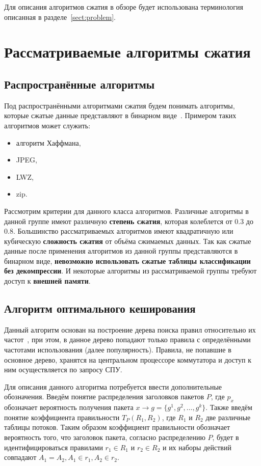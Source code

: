 \documentclass[a4paper, 12pt, titlepage, finall]{extreport}
\begin{document}
        Для описания алгоритмов сжатия в обзоре будет использована терминология описанная в разделе~\ref{sect:problem}. 

    \section{Рассматриваемые алгоритмы сжатия}
        \subsection{Распространённые алгоритмы}
            Под распространёнными алгоритмами сжатия будем понимать алгоритмы, 
            которые сжатые данные представляют в бинарном виде~\cite{kodituwakku2010comparison}. 
            Примером таких алгоритмов может служить:
            \begin{itemize}
                \item алгоритм Хаффмана,
                \item JPEG,
                \item LWZ,
                \item zip.
            \end{itemize}
            
            Рассмотрим критерии для данного класса алгоритмов. Различные алгоритмы в данной группе имеют различную \textbf{степень сжатия}, 
            которая колеблется от 0.3 до 0.8. Большинство рассматриваемых алгоритмов имеют квадратичную или кубическую \textbf{сложность сжатия} 
            от объёма сжимаемых данных. Так как сжатые данные после применения алгоритмов из данной группы представляются в бинарном виде,
            \textbf{невозможно использовать сжатые таблицы классификации без декомпрессии}. И некоторые алгоритмы из рассматриваемой группы требуют доступ к \textbf{внешней памяти}.
        \subsection{Алгоритм оптимального кеширования}
            Данный алгоритм основан на построение дерева поиска правил относительно их частот~\cite{rottenstreich2016optimal}, при этом, в данное дерево
            попадают только правила с определёнными частотами использования (далее популярность). 
            Правила, не попавшие в основное дерево, хранятся на центральном процессоре коммутатора и  доступ к ним осуществляется по запросу СПУ.
            
            Для описания данного алгоритма потребуется ввести дополнительные обозначения. Введём понятие распределения заголовков пакетов \(P\),
            где \(p_x\) обозначает вероятность получения пакета \(x \rightarrow g=\{g^1,g^2,\ldots,g^k\}\).
            Также введём понятие коэффициента правильности \(T_P(R_1, R_2)\), где \(R_1\) и \(R_2\) две различные таблицы потоков. 
            Таким образом коэффициент правильности обозначает вероятность того, что заголовок пакета, согласно распределению \(P\),
            будет в идентифицироваться правилами \(r_1 \in R_1\) и \(r_2 \in R_2\) и их наборы действий совпадают \(A_1 = A_2, A_1 \in r_1, A_2 \in r_2\).
            
\end{document}
